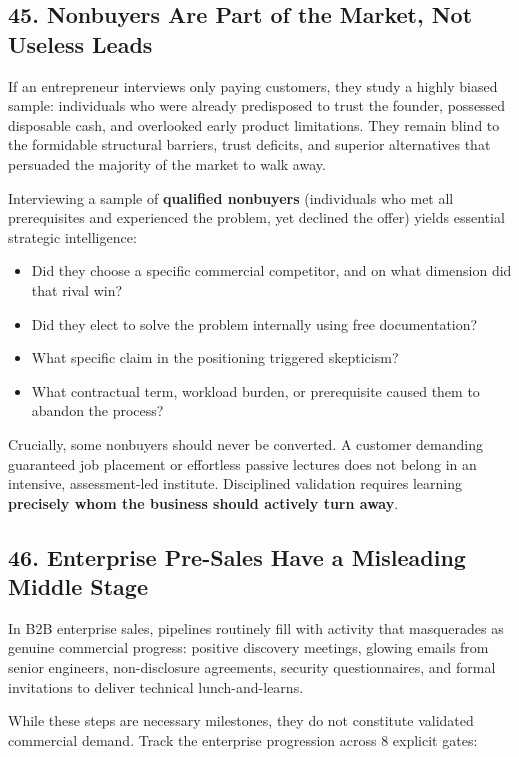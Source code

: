 \subsection*{45. Nonbuyers Are Part of the Market, Not Useless Leads}

If an entrepreneur interviews only paying customers, they study a highly biased sample: individuals who were already predisposed to trust the founder, possessed disposable cash, and overlooked early product limitations. They remain blind to the formidable structural barriers, trust deficits, and superior alternatives that persuaded the majority of the market to walk away.

Interviewing a sample of \textbf{qualified nonbuyers} (individuals who met all prerequisites and experienced the problem, yet declined the offer) yields essential strategic intelligence:

\begin{itemize}
    \item Did they choose a specific commercial competitor, and on what dimension did that rival win?
    \item Did they elect to solve the problem internally using free documentation?
    \item What specific claim in the positioning triggered skepticism?
    \item What contractual term, workload burden, or prerequisite caused them to abandon the process?
\end{itemize}

Crucially, some nonbuyers should never be converted. A customer demanding guaranteed job placement or effortless passive lectures does not belong in an intensive, assessment-led institute. Disciplined validation requires learning \textbf{precisely whom the business should actively turn away}.

\subsection*{46. Enterprise Pre-Sales Have a Misleading Middle Stage}

In B2B enterprise sales, pipelines routinely fill with activity that masquerades as genuine commercial progress: positive discovery meetings, glowing emails from senior engineers, non-disclosure agreements, security questionnaires, and formal invitations to deliver technical lunch-and-learns.

While these steps are necessary milestones, they do not constitute validated commercial demand. Track the enterprise progression across 8 explicit gates:

